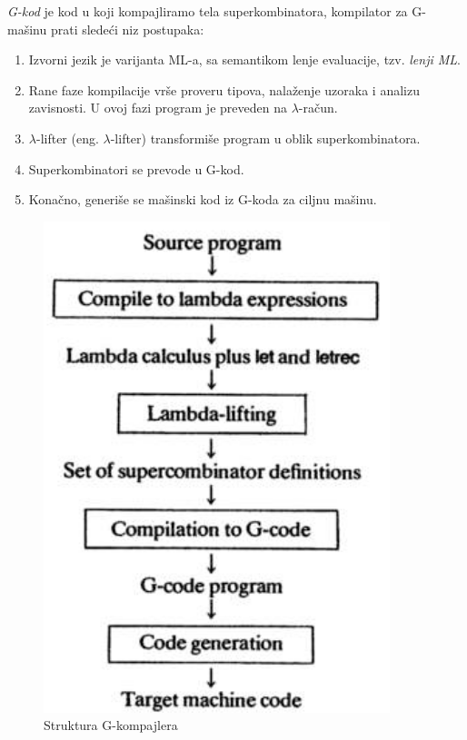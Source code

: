 {\em G-kod} je kod u koji kompajliramo tela superkombinatora, kompilator za G-mašinu prati sledeći niz postupaka:
\begin{enumerate}
\item Izvorni jezik je varijanta ML-a, sa semantikom lenje evaluacije, tzv. {\em lenji ML}.
\item Rane faze kompilacije vrše proveru tipova, nalaženje uzoraka i analizu zavisnosti. U ovoj fazi program je preveden na $\lambda$-račun.
\item $\lambda$-lifter (eng. $\lambda$-lifter) transformiše program u oblik superkombinatora.   
\item Superkombinatori se prevode u G-kod.
\item Konačno, generiše se mašinski kod iz G-koda za ciljnu mašinu.
\end{enumerate}
\begin{figure}[h!]
\begin{center}
\includegraphics[scale=0.3]{gkomp.png}
\end{center}
\caption{Struktura G-kompajlera}
\label{fig:gcompiler}
\end{figure}

